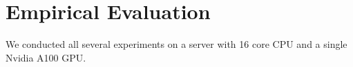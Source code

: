\section{Empirical Evaluation}

We conducted all several experiments on a server with 16 core CPU and a single Nvidia A100 GPU.




